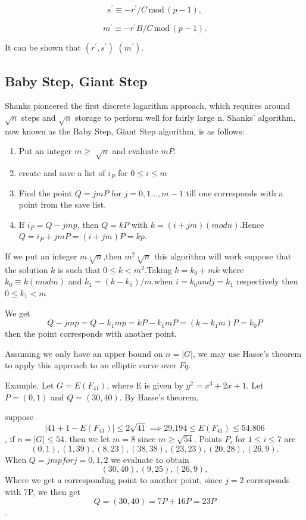 $$s^{\prime} \equiv -r^{\prime}/C\,{\text{mod}}\,(p-1),$$

$$m^{\prime} \equiv -r^{\prime}B/C\,{\text{mod}}\,(p-1).$$

It can be shown that $(r^{\prime},s^{\prime})$  $(m^{\prime})$.

\subsection{Baby Step, Giant Step}
Shanks pioneered the first discrete logarithm approach, which requires around $ \sqrt n$ steps and $ \sqrt n$ storage to perform well for fairly large n. Shanks' algorithm, now known as the Baby Step, Giant Step algorithm, is as follows:
\begin{enumerate}
 \item Put an integer $m\geq$ $ \sqrt n$ and evaluate $mP$.
  \item create and save a list of ${i}_P$ for $0\leq i \leq m$
   \item Find the point $Q=jmP$ for $j=0,1...,m-1$ till one corresponds with a point from the save list.
    \item If ${i}_P=Q-jmp$, then $Q=kP$ with $k=(i+jm)(mod n)$.Hence $Q={i}_P + jmP=(i+jm)P=kp$.
\end{enumerate}
If we put an integer $m \sqrt[1]{n}$,then $m^{2} \sqrt[1]{n}$ this algorithm will work suppose that the solution $k$ is such that $0\leq k < m^{2}$.Taking $k=k_{0}+mk$ where $k_{0}\equiv k (mod m)$ and $k_{1}=(k-k_{0})/m$.when $i=k_{0} and j=k_{1}$ respectively then $0 \leq k_{1}<m$

We get
$$Q-jmp=Q-k_{1}mp=kP-k_{1}mP=(k-k_{1}m)P=k_{0}P $$
then the point corresponds with another point.

Assuming we only have an upper bound on $n=|G|$, we may use Hasse's theorem to apply this approach to an elliptic curve over $F q$.

Example.
Let $G = E(F_{41})$, where E is given by $y^{2}=x^{3}+2x+1$. Let $ P=(0,1)$ and $Q = (30,40)$. By Hasse's theorem,

suppose
$$| 41+1- E( F_{41} ) | \leq 2\sqrt{41} \implies 29.194 \leq E(F_{41}) \leq 54.806$$,
if $n=|G| \leq 54$. then we let $m=8$ since $m \geq \sqrt{54}$. Points $P_{i}$ for $1\leq i \leq 7$ are 
$$(0,1),(1,39),(8,23),(38,38),(23,23),(20,28),(26,9).$$
When $Q=jmp for j=0,1,2$ we evaluate to obtain 
$$(30,40),(9,25),(26,9),$$
Where we get a corresponding point to another point, since $j=2$ corresponds with 7P, we then get 
$$Q=(30,40)=7P+16P=23P$$. 

